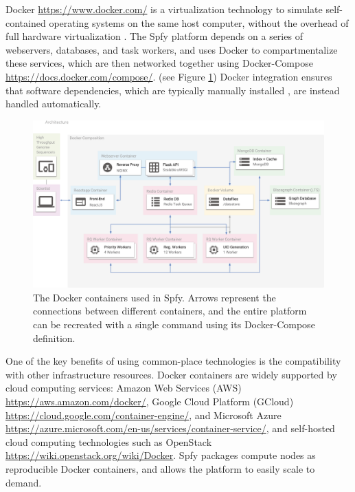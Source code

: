 \documentclass{article}
\begin{document}

Docker \url{https://www.docker.com/} is a virtualization technology to simulate self-contained operating systems on the same host computer, without the overhead of full hardware virtualization \cite{felter2015updated}.
The Spfy platform depends on a series of webservers, databases, and task workers, and uses Docker to compartmentalize these services, which are then networked together using Docker-Compose \url{https://docs.docker.com/compose/}.
(see Figure \ref{fig-docker})
Docker integration ensures that software dependencies, which are typically manually installed \cite{doi:10.1093/bioinformatics/btu153,laing2010pan,inouye2014srst2,naccache2014cloud}, are instead handled automatically.

\begin{figure}[!hb]
\begin{center}
\includegraphics[width=\textwidth]{images/docker}
\end{center}
\caption{The Docker containers used in Spfy. Arrows represent the connections between different containers, and the entire platform can be recreated with a single command using its Docker-Compose definition.}
\label{fig-docker}
\end{figure}

One of the key benefits of using common-place technologies is the compatibility with other infrastructure resources.
Docker containers are widely supported by cloud computing services: Amazon Web Services (AWS) \url{https://aws.amazon.com/docker/}, Google Cloud Platform (GCloud) \url{https://cloud.google.com/container-engine/}, and Microsoft Azure \url{https://azure.microsoft.com/en-us/services/container-service/}, and self-hosted cloud computing technologies such as OpenStack \url{https://wiki.openstack.org/wiki/Docker}.
Spfy packages compute nodes as reproducible Docker containers, and allows the platform to easily scale to demand.
\end{document}
